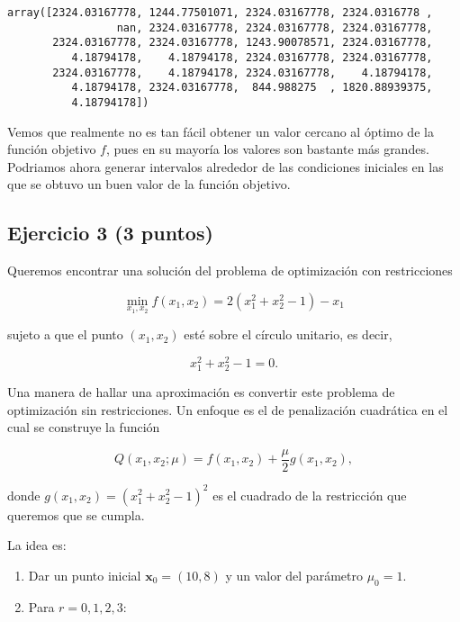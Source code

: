 \documentclass[11pt]{article}
\makeatletter
\providecommand{\tightlist}{%
      \setlength{\itemsep}{0pt}\setlength{\parskip}{0pt}}
\newcommand{\boxspacing}{\kern\kvtcb@left@rule\kern\kvtcb@boxsep}
\newcommand{\prompt}[4]{
        {\ttfamily\llap{{\color{#2}[#3]:\hspace{3pt}#4}}\vspace{-\baselineskip}}
    }
\makeatother
\begin{document}
            \begin{tcolorbox}[breakable, size=fbox, boxrule=.5pt, pad at break*=1mm, opacityfill=0]
\prompt{Out}{outcolor}{26}{\boxspacing}
\begin{Verbatim}[commandchars=\\\{\}]
array([2324.03167778, 1244.77501071, 2324.03167778, 2324.0316778 ,
                 nan, 2324.03167778, 2324.03167778, 2324.03167778,
       2324.03167778, 2324.03167778, 1243.90078571, 2324.03167778,
          4.18794178,    4.18794178, 2324.03167778, 2324.03167778,
       2324.03167778,    4.18794178, 2324.03167778,    4.18794178,
          4.18794178, 2324.03167778,  844.988275  , 1820.88939375,
          4.18794178])
\end{Verbatim}
\end{tcolorbox}
        
    Vemos que realmente no es tan fácil obtener un valor cercano al óptimo
de la función objetivo \(f\), pues en su mayoría los valores son
bastante más grandes. Podriamos ahora generar intervalos alrededor de
las condiciones iniciales en las que se obtuvo un buen valor de la
función objetivo.

    \hypertarget{ejercicio-3-3-puntos}{%
\subsection{Ejercicio 3 (3 puntos)}\label{ejercicio-3-3-puntos}}

Queremos encontrar una solución del problema de optimización con
restricciones

\[ \min_{x_1,x_2} f(x_1,x_2) = 2(x_1^2 + x_2^2 - 1) - x_1 \]

sujeto a que el punto \((x_1,x_2)\) esté sobre el círculo unitario, es
decir,

\[ x_1^2 + x_2^2 - 1 = 0.\]

Una manera de hallar una aproximación es convertir este problema de
optimización sin restricciones. Un enfoque es el de penalización
cuadrática en el cual se construye la función

\[ Q(x_1, x_2; \mu) = f(x_1,x_2) + \frac{\mu}{2} g(x_1, x_2),\]

donde \(g(x_1, x_2) = (x_1^2 + x_2^2 - 1)^2\) es el cuadrado de la
restricción que queremos que se cumpla.

La idea es:

\begin{enumerate}
\def\labelenumi{\arabic{enumi}.}
\tightlist
\item
  Dar un punto inicial \(\mathbf{x}_0 =(10, 8)\) y un valor del
  parámetro \(\mu_0= 1\).
\item
  Para \(r=0, 1, 2, 3\):
\end{enumerate}
\end{document}
